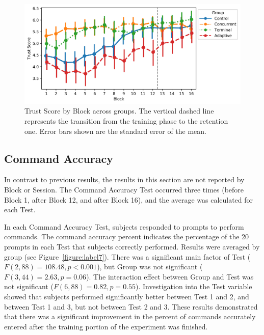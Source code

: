 \begin{figure}[bt!]
	\centering
	\includegraphics[height=.4\textwidth]{figures/EMG/TrustScore}
	\caption[Trust Score by Block across groups]{Trust Score by Block across groups.
		The vertical dashed line represents the transition from the training phase to the retention one.
		Error bars shown are the standard error of the mean.}
	\label{figure:label6}
\end{figure}

\subsection{Command Accuracy}
In contrast to previous results, the results in this section are not reported by Block or Session.
The Command Accuracy Test occurred three times (before Block 1, after Block 12, and after Block 16), and the average was calculated for each Test.

In each Command Accuracy Test, subjects responded to prompts to perform commands.
The command accuracy percent indicates the percentage of the 20 prompts in each Test that subjects correctly performed.
Results were averaged by group (see Figure~\ref{figure:label7}).
There was a significant main factor of Test ($F(2, 88) = 108.48, p < 0.001$), but Group was not significant ($F(3, 44) = 2.63, p = 0.06$).
The interaction effect between Group and Test was not significant ($F(6, 88) = 0.82, p = 0.55$).
Investigation into the Test variable showed that subjects performed significantly better between Test 1 and 2, and between Test 1 and 3, but not between Test 2 and 3.
These results demonstrated that there was a significant improvement in the percent of commands accurately entered after the training portion of the experiment was finished.

